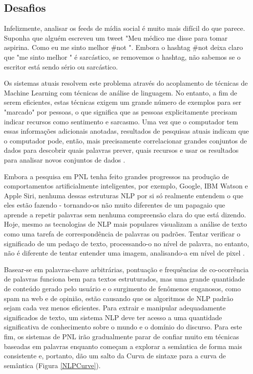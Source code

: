 \documentclass[
	12pt,				%
	openright,			%
	oneside,			%
	a4paper,			%
	english,			%
	spanish,			%
	brazil				%
	]{abntex2}
\begin{document}
	\subsection*{Desafios}
Infelizmente, analisar os feeds de mídia social é muito mais difícil do que parece. Suponha que alguém escreveu um tweet "Meu médico me disse para tomar aspirina. Como eu me sinto melhor \#not ". Embora o hashtag \#not deixa claro que "me sinto melhor " é sarcástico, se removemos o hashtag, não sabemos se o escritor está sendo sério ou sarcástico.

Os sistemas atuais resolvem este problema através do acoplamento de técnicas de Machine Learning com técnicas de análise de linguagem. No entanto, a fim de serem eficientes, estas técnicas exigem um grande número de exemplos para ser "marcado" por pessoas, o que significa que as pessoas explicitamente precisam indicar recursos como sentimento e sarcasmo. Uma vez que o computador tem essas informações adicionais anotadas, resultados de pesquisas atuais indicam que o computador pode, então, mais precisamente correlacionar grandes conjuntos de dados para descobrir quais palavras prever, quais recursos e usar os resultados para analisar novos conjuntos de dados \cite{book_social_machines}.

Embora a pesquisa em PNL tenha feito grandes progressos na produção de comportamentos artificialmente inteligentes, por exemplo, Google, IBM Watson e Apple Siri, nenhuma dessas estruturas NLP por si só realmente entendem o que eles estão fazendo - tornando-os não muito diferentes de um papagaio que aprende a repetir palavras sem nenhuma compreensão clara do que está dizendo. Hoje, mesmo as tecnologias de NLP mais populares visualizam a análise de texto como uma tarefa de correspondência de palavras ou padrões. Tentar verificar o significado de um pedaço de texto, processando-o no nível de palavra, no entanto, não é diferente de tentar entender uma imagem, analisando-a em nível de pixel \cite{book_Cambria2015}. 

Basear-se em palavras-chave arbitrárias, pontuação e frequências de co-ocorrência de palavras funciona bem para textos estruturados, mas uma grande quantidade de conteúdo gerado pelo usuário e o surgimento de fenômenos enganosos, como spam na web e de opinião, estão causando que os algoritmos de NLP padrão sejam cada vez menos eficientes. Para extrair e manipular adequadamente significados de texto, um sistema NLP deve ter acesso a uma quantidade significativa de conhecimento sobre o mundo e o domínio do discurso.
Para este fim, os sistemas de PNL irão gradualmente parar de confiar muito em técnicas baseadas em palavras enquanto começam a explorar a semântica de forma mais consistente e, portanto, dão um salto da Curva de sintaxe para a curva de semântica (Figura \ref{NLPCurve}).
\end{document}
